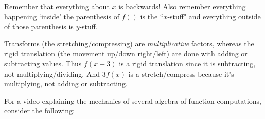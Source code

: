 \begin{hint}
    Remember that everything about $x$ is backwards! Also remember everything happening `inside' the parenthesis of $f()$ is the ``$x$-stuff" and everything outside of those parenthesis is $y$-stuff.

\end{hint}

\begin{hint}
    Transforms (the stretching/compressing) are \textit{multiplicative} factors, whereas the rigid translation (the movement up/down right/left) are done with adding or subtracting values. Thus $f(x-3)$ is a rigid translation since it is subtracting, not multiplying/dividing. And $3f(x)$ is a stretch/compress because it's multiplying, not adding or subtracting.

\end{hint}

\begin{hint}
    For a video explaining the mechanics of several algebra of function computations, consider the following:
\end{hint}
